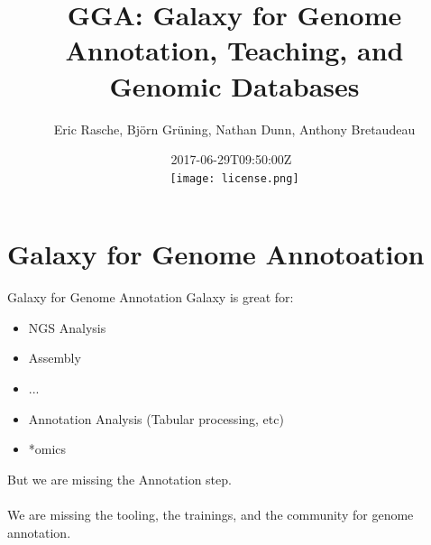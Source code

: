 \documentclass[12pt]{phage3slides} %
\title[Galaxy for Genome Annotation, Teaching, Databases]{GGA: Galaxy for Genome Annotation, Teaching, and Genomic Databases}
\author[ER, BG, ND, AB]{Eric Rasche, Bj\"orn Gr\"uning, Nathan Dunn, Anthony Bretaudeau}
\date{2017-06-29T09:50:00Z\ \\\texttt{[image: license.png]}}
\begin{document}
\frame{\titlepage}




\section[GGA]{Galaxy for Genome Annotoation}
\begin{frame}{Galaxy for Genome Annotation}
    Galaxy is great for:
    \begin{itemize}
        \item NGS Analysis
        \item Assembly
        \item ...
        \item Annotation Analysis (Tabular processing, etc)
        \item *omics
    \end{itemize}
    But we are missing the Annotation step.\\\ \\
    We are missing the tooling, the
    trainings, and the community for genome annotation.
\end{frame}
\end{document}
